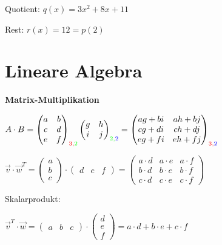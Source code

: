 Quotient: $q(x) = 3x^2 + 8x + 11$

Rest: $r(x) = 12 = p(2)$

\section{Lineare Algebra}

\textbf{Matrix-Multiplikation}

$\displaystyle{
    A \cdot B = 
    \begin{pmatrix}
        a & b\\
        c & d\\
        e & f
    \end{pmatrix}_{\color{red} 3 , \color{green} 2 }
    \begin{pmatrix}
        g & h\\
        i & j
    \end{pmatrix}_{\color{green} 2, \color{blue} 2}
    = 
    \begin{pmatrix}
        a g + b i & a h + b j\\
        c g + d i & c h + d j\\
        e g + f i & e h + f j
    \end{pmatrix}_{\color{red} 3, \color{blue} 2}
}$

$\displaystyle{
    \vec{v} \cdot \vec{w}^T = 
    \begin{pmatrix}
        a \\
        b\\
        c
    \end{pmatrix}
    \cdot
    \begin{pmatrix}
        d & e & f
    \end{pmatrix}
    = 
    \begin{pmatrix}
        a \cdot d & a \cdot e & a \cdot f\\
        b \cdot d & b \cdot e & b \cdot f\\
        c \cdot d & c \cdot e & c \cdot f
    \end{pmatrix}
}$

Skalarprodukt:

$\displaystyle{
    \vec{v}^T \cdot \vec{w} = 
    \begin{pmatrix}
        a & b & c
    \end{pmatrix}
    \cdot
    \begin{pmatrix}
        d\\
        e\\
        f
    \end{pmatrix}
    = a \cdot d + b \cdot e + c \cdot f
}$

